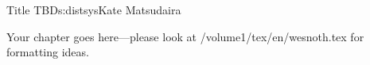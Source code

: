 \begin{aosachapter}{Title TBD}{s:distsys}{Kate Matsudaira}

Your chapter goes here---please look at /volume1/tex/en/wesnoth.tex for 
formatting ideas.

\end{aosachapter}
